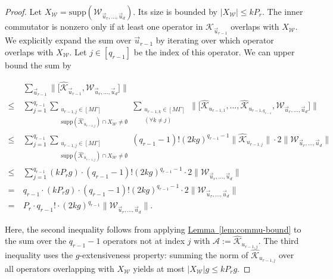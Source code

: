 \documentclass[aps,pra,reprint,groupedaddress,floatfix]{revtex4-2}
\newcommand{\lem}[1]{\hyperref[lem:#1]{Lemma~\ref*{lem:#1}}}
\newcommand{\supp}{\mathrm{supp}}
\newcommand{\mc}{\mathcal}
\begin{document}
\begin{proof}
    Let $X_{\mathcal{W}} = \supp(\mathcal{W}_{\vec{u}_{r}, \ldots, \vec{u}_d})$. Its size is bounded by $|X_{\mathcal{W}}| \le k P_r$. The inner commutator is nonzero only if at least one operator in $\hat{\mathcal{K}}_{\vec{u}_{r-1}}$ overlaps with $X_{\mathcal{W}}$.
    We explicitly expand the sum over $\vec{u}_{r-1}$ by iterating over which operator overlaps with $X_{\mathcal{W}}$. Let $j \in [q_{r-1}]$ be the index of this operator. We can upper bound the sum by
    \begin{widetext}
    \begin{align*}
        & \sum_{\vec{u}_{r-1}} \bigg\| \Big[ \hat{\mathcal{K}}_{\vec{u}_{r-1}}, \mathcal{W}_{\vec{u}_{r}, \ldots, \vec{u}_d} \Big] \bigg\| \\
        \le~& \sum_{j=1}^{q_{r-1}} \sum_{\substack{u_{r-1, j} \in [M\Gamma] \\ \supp(\hat{\mathcal{K}}_{u_{r-1, j}}) \cap X_{\mathcal{W}} \neq \emptyset}} \sum_{\substack{u_{r-1, k} \in [M\Gamma] \\ (\forall k \neq j)}} \Big\| \big[ \hat{\mathcal{K}}_{u_{r-1,1}}, \ldots, \hat{\mathcal{K}}_{u_{r-1, q_{r-1}}}, \mathcal{W}_{\vec{u}_{r}, \ldots, \vec{u}_d} \big] \Big\| \\
        \le~& \sum_{j=1}^{q_{r-1}} \sum_{\substack{u_{r-1, j} \in [M\Gamma] \\ \supp(\hat{\mathcal{K}}_{u_{r-1, j}}) \cap X_{\mathcal{W}} \neq \emptyset}} (q_{r-1}-1)! (2kg)^{q_{r-1}-1} \|\hat{\mathcal{K}}_{u_{r-1, j}}\| \cdot 2 \Big\|\mathcal{W}_{\vec{u}_{r}, \ldots, \vec{u}_d}\Big\| \\
        \le~& \sum_{j=1}^{q_{r-1}} (k P_r g) \cdot (q_{r-1}-1)! (2kg)^{q_{r-1}-1} \cdot 2 \Big\|\mathcal{W}_{\vec{u}_{r}, \ldots, \vec{u}_d}\Big\| \\
        =~& q_{r-1} \cdot (k P_r g) \cdot (q_{r-1}-1)! (2kg)^{q_{r-1}-1} \cdot 2 \Big\|\mathcal{W}_{\vec{u}_{r}, \ldots, \vec{u}_d}\Big\| \\
        =~& P_r \cdot q_{r-1}! \cdot (2kg)^{q_{r-1}} \Big\|\mathcal{W}_{\vec{u}_{r}, \ldots, \vec{u}_d}\Big\|.
    \end{align*}
    \end{widetext}
    Here, the second inequality follows from applying \lem{commu-bound} to the sum over the $q_{r-1}-1$ operators not at index $j$ with $\mc A:= \hat{\mathcal{K}}_{u_{r-1, j}}$.  The third inequality uses the $g$-extensiveness property: summing the norm of $\hat{\mathcal{K}}_{u_{r-1, j}}$ over all operators overlapping with $X_{\mathcal{W}}$ yields at most $|X_{\mathcal{W}}|g \le k P_r g$.
    

\end{proof}
\end{document}
